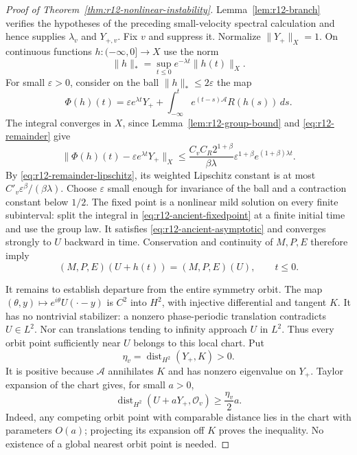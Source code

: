 \begin{proof}[Proof of Theorem~\ref{thm:r12-nonlinear-instability}]
Lemma~\ref{lem:r12-branch} verifies the hypotheses of the preceding
small-velocity spectral calculation and hence supplies $\lambda_v$ and
$Y_{+,v}$. Fix $v$ and suppress it. Normalize $\|Y_+\|_X=1$. On continuous
functions $h:(-\infty,0]\to X$ use the norm
\[
 \|h\|_* =\sup_{t\le0}e^{-\lambda t}\|h(t)\|_X.
\]
For small $\varepsilon>0$, consider on the ball $\|h\|_*\le2\varepsilon$
the map
\begin{equation}\label{eq:r12-ancient-fixedpoint}
 \Phi(h)(t)=\varepsilon e^{\lambda t}Y_+
       +\int_{-\infty}^t e^{(t-s)\mathcal A}R(h(s))\,ds.
\end{equation}
The integral converges in $X$, since Lemma~\ref{lem:r12-group-bound}
and \eqref{eq:r12-remainder} give
\begin{equation}\label{eq:r12-ancient-error}
 \|\Phi(h)(t)-\varepsilon e^{\lambda t}Y_+\|_X
 \le \frac{C_v C_R2^{1+\beta}}{\beta\lambda}
             \varepsilon^{1+\beta}e^{(1+\beta)\lambda t}.
\end{equation}
By \eqref{eq:r12-remainder-lipschitz}, its weighted Lipschitz constant
is at most $C'_v\varepsilon^\beta/(\beta\lambda)$.
Choose $\varepsilon$ small enough for invariance of the ball and a
contraction constant below $1/2$. The fixed point is a nonlinear mild
solution on every finite subinterval: split the integral in
\eqref{eq:r12-ancient-fixedpoint} at a finite initial time and use
the group law. It satisfies \eqref{eq:r12-ancient-asymptotic} and
converges strongly to $U$ backward in time. Conservation and continuity
of $M,P,E$ therefore imply
\begin{equation}\label{eq:r12-exact-invariants}
 (M,P,E)(U+h(t))=(M,P,E)(U),\qquad t\le0.
\end{equation}

It remains to establish departure from the entire symmetry orbit.
The map $(\theta,y)\mapsto e^{i\theta}U(\cdot-y)$ is $C^2$ into
$H^2$, with injective differential and tangent $K$. It has no
nontrivial stabilizer: a nonzero phase-periodic translation contradicts
$U\in L^2$. Nor can translations tending to infinity approach $U$ in
$L^2$. Thus every orbit point sufficiently near $U$ belongs to this
local chart. Put
\[
 \eta_v=\operatorname{dist}_{H^2}(Y_+,K)>0.
\]
It is positive because $\mathcal A$ annihilates $K$ and has nonzero
eigenvalue on $Y_+$. Taylor expansion of the chart gives, for small
$a>0$,
\begin{equation}\label{eq:r12-orbit-transverse}
 \operatorname{dist}_{H^2}(U+aY_+,\mathcal O_v)
                          \ge\frac{\eta_v}{2}a.
\end{equation}
Indeed, any competing orbit point with comparable distance lies in the
chart with parameters $O(a)$; projecting its expansion off $K$ proves
the inequality. No existence of a global nearest orbit point is needed.


\end{proof}

